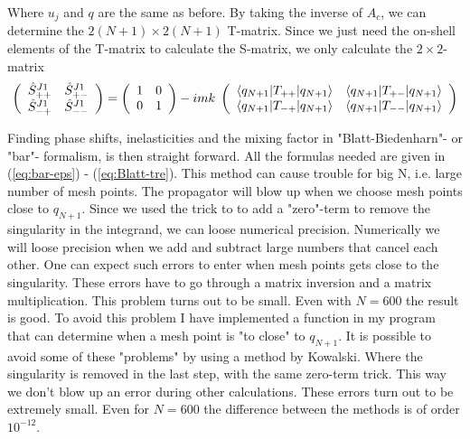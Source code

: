 Where $u_j$ and $q$ are the same as before. By taking the inverse of $A_c$, we can determine the $2(N+1)\times 2(N+1)$
T-matrix. Since we just need the on-shell elements of the T-matrix to calculate the S-matrix, we only calculate the
$2\times 2$-matrix
\begin{equation}\label{eq:SuperSmatrisen}
\left(
\begin{array}{cc} {{ \op{S}^{J1}_{++} }}
&
{ \op{S}^{J1}_{+-} } \\
 \op{S}^{J1}_{-+}
&
 \op{S}^{J1}_{--}
\end{array} \right)
=
\left(
\begin{array}{cc}
1 & 0\\
0 &1
\end{array} \right) 
-imk\; 
\left( \begin{array}{cc}
\braketm{q_{N+1}}{T_{++}}{q_{N+1}} & \braketm{q_{N+1}}{T_{+-}}{q_{N+1}} \\
\braketm{q_{N+1}}{T_{-+}}{q_{N+1}} & \braketm{q_{N+1}}{T_{--}}{q_{N+1}}
\end{array}\right)
\end{equation}

Finding phase shifts, inelasticities and the mixing factor in "Blatt-Biedenharn"- or "bar"- formalism,
is then straight forward. All the formulas needed
are given in (\ref{eq:bar-eps}) - (\ref{eq:Blatt-tre}).
\nl
This method can cause trouble for big N, i.e. large number of mesh points. 
The propagator will blow up when we choose mesh points close to $q_{N+1}$. 
Since we used the trick to to add a "zero"-term to remove the singularity in the integrand, 
we can loose numerical precision. 
Numerically we will loose precision when we add and subtract large numbers that cancel each other. 
One can expect such errors to enter when mesh points gets close to the singularity. 
These errors have to go through a matrix
inversion and a matrix multiplication.  This problem turns out to be small. Even with $N=600$ the result is good. 
To avoid this problem I have implemented a function in my program that can determine when a mesh point is "to close"
to $q_{N+1}$. It is possible to avoid some of these "problems" by using a method by Kowalski. Where the singularity is removed in the last step,
with the same zero-term trick. This way we don't blow up an error during other calculations. These errors turn out to be extremely small. 
Even for $N=600$ the difference between the methods is of order $10^{-12}$.    





